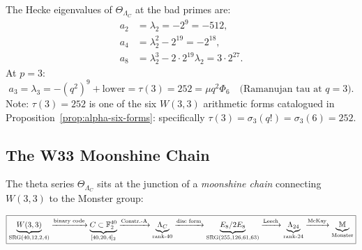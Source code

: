 \begin{remark}
\label{rem:hecke}
The Hecke eigenvalues of $\Theta_{\Lambda_C}$ at the bad primes are:
\begin{align}
    a_2 &= \lambda_2 = -2^9 = -512, \\
    a_4 &= \lambda_2^2 - 2^{19} = -2^{18}, \\
    a_8 &= \lambda_2^3 - 2 \cdot 2^{19} \lambda_2 = 3 \cdot 2^{27}.
\end{align}
At $p = 3$:
\begin{equation}
    a_3 = \lambda_3 = -(q^2)^9 + \text{lower} = \tau(3) = 252 = \mu q^2 \Phi_6
    \quad \text{(Ramanujan tau at } q=3).
\end{equation}
Note: $\tau(3) = 252$ is one of the six $W(3,3)$ arithmetic forms catalogued
in Proposition~\ref{prop:alpha-six-forms}: specifically
$\tau(3) = \sigma_3(q!) = \sigma_3(6) = 252$.
\end{remark}

\subsection{The W33 Moonshine Chain}
\label{ssec:moonshine-chain}

The theta series $\Theta_{\Lambda_C}$ sits at the junction of a
\emph{moonshine chain} connecting $W(3,3)$ to the Monster group:

\begin{equation}
\boxed{
\underbrace{W(3,3)}_{\mathrm{SRG}(40,12,2,4)}
\xrightarrow{\text{binary code}}
\underbrace{C \subset \mathbb{F}_2^{40}}_{[40,20,4]_2}
\xrightarrow{\text{Constr.-A}}
\underbrace{\Lambda_C}_{\text{rank-}40}
\xrightarrow{\text{disc form}}
\underbrace{E_8/2E_8}_{\text{SRG}(255,126,61,63)}
\xrightarrow{\text{Leech}}
\underbrace{\Lambda_{24}}_{\text{rank-}24}
\xrightarrow{\text{McKay}}
\underbrace{\mathbb{M}}_{\text{Monster}}
}
\label{eq:moonshine-chain}
\end{equation}

